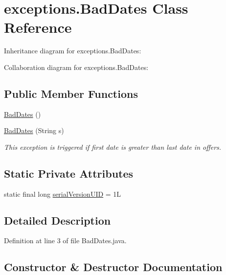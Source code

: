 \hypertarget{classexceptions_1_1BadDates}{}\section{exceptions.\+Bad\+Dates Class Reference}
\label{classexceptions_1_1BadDates}


Inheritance diagram for exceptions.\+Bad\+Dates\+:


Collaboration diagram for exceptions.\+Bad\+Dates\+:
\subsection*{Public Member Functions}
\begin{DoxyCompactItemize}
\item 
\mbox{\hyperlink{classexceptions_1_1BadDates_ad4918ff10b5e46df93774ea9087e6d04}{Bad\+Dates}} ()
\item 
\mbox{\hyperlink{classexceptions_1_1BadDates_a34213c984892e85612e3a2e44220e896}{Bad\+Dates}} (String s)
\begin{DoxyCompactList}\small\item\em This exception is triggered if first date is greater than last date in offers. \end{DoxyCompactList}\end{DoxyCompactItemize}
\subsection*{Static Private Attributes}
\begin{DoxyCompactItemize}
\item 
static final long \mbox{\hyperlink{classexceptions_1_1BadDates_a1703e41273cdde53ece45e307839c449}{serial\+Version\+U\+ID}} = 1L
\end{DoxyCompactItemize}


\subsection{Detailed Description}


Definition at line 3 of file Bad\+Dates.\+java.



\subsection{Constructor \& Destructor Documentation}
\mbox{\label{classexceptions_1_1BadDates_ad4918ff10b5e46df93774ea9087e6d04}} 
